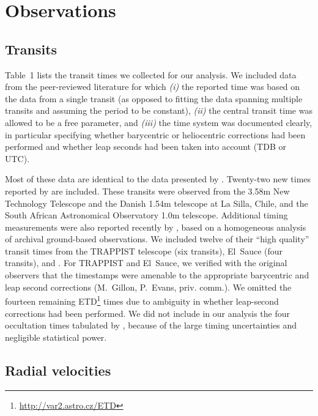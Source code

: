 \documentclass[12pt,twocolumn,tighten]{aastex62}
\begin{document}
\section{Observations}
\label{sec:observations}

\subsection{Transits}

Table~1 lists the transit times we collected for our analysis.  We
included data from the peer-reviewed literature for which {\it (i)}
the reported time was based on the data from a single transit (as
opposed to fitting the data spanning multiple transits and assuming
the period to be constant), {\it (ii)} the central transit time was
allowed to be a free parameter, and {\it (iii)} the time system was
documented clearly, in particular specifying whether barycentric or
heliocentric corrections had been performed and whether leap seconds
had been taken into account (TDB or UTC).

Most of these data are identical to the data presented by
.  Twenty-two new times reported by
\citet{southworth_transit_2019} are included.  These transits were
observed from the 3.58m New Technology Telescope and the Danish 1.54m
telescope at La Silla, Chile, and the South African Astronomical
Observatory 1.0m telescope.  Additional timing measurements were also
reported recently by \citet{baluev_2019}, based on a homogeneous
analysis of archival ground-based observations.  We included twelve of
their ``high quality'' transit times from the TRAPPIST telescope (six
transits), El~Sauce (four transits), and \citet{petrucci_no_2013}.
For TRAPPIST and El~Sauce, we verified with the original observers
that the timestamps were amenable to the appropriate barycentric and
leap second corrections (M.~Gillon, P.~Evans, priv{.} comm{.}).  We
omitted the fourteen remaining \citeauthor{baluev_2019}
ETD\footnote{\url{http://var2.astro.cz/ETD}} times due to ambiguity in
whether leap-second corrections had been performed.  We did not
include in our analysis the four occultation times tabulated by
, because of the large timing
uncertainties and negligible statistical power.

\subsection{Radial velocities}
\end{document}
